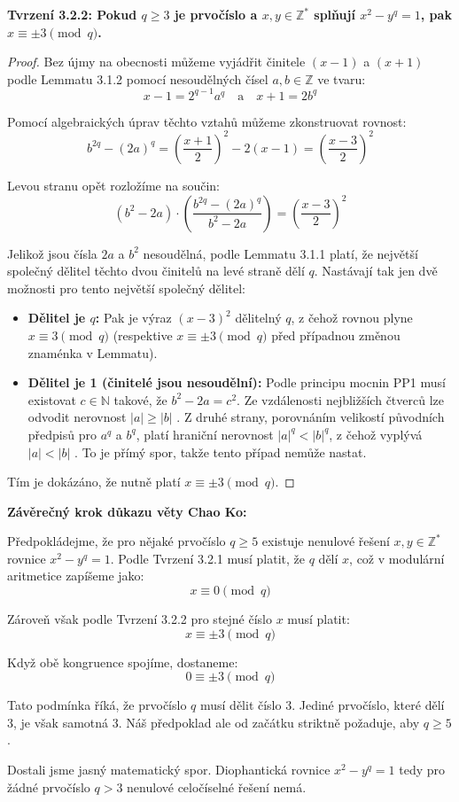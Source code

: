 \documentclass[a4paper,12pt]{article}
\begin{document}
\vspace{1em}
\textbf{Tvrzení 3.2.2: Pokud $q \ge 3$ je prvočíslo a $x, y \in \mathbb{Z}^*$ splňují $x^2 - y^q = 1$, pak $x \equiv \pm 3 \pmod q$.}
\vspace{0.5em}
\begin{proof}
Bez újmy na obecnosti můžeme vyjádřit činitele $(x-1)$ a $(x+1)$ podle Lemmatu 3.1.2 pomocí nesoudělných čísel $a, b \in \mathbb{Z}$ ve tvaru:
$$x - 1 = 2^{q-1}a^q \quad \text{a} \quad x + 1 = 2b^q $$

Pomocí algebraických úprav těchto vztahů můžeme zkonstruovat rovnost:
$$b^{2q} - (2a)^q = \left(\frac{x+1}{2}\right)^2 - 2(x-1) = \left(\frac{x-3}{2}\right)^2 $$

Levou stranu opět rozložíme na součin:
$$(b^2 - 2a) \cdot \left(\frac{b^{2q} - (2a)^q}{b^2 - 2a}\right) = \left(\frac{x-3}{2}\right)^2 $$

Jelikož jsou čísla $2a$ a $b^2$ nesoudělná, podle Lemmatu 3.1.1 platí, že největší společný dělitel těchto dvou činitelů na levé straně dělí $q$. Nastávají tak jen dvě možnosti pro tento největší společný dělitel:
\begin{itemize}
    \item \textbf{Dělitel je $q$:} Pak je výraz $(x-3)^2$ dělitelný $q$, z čehož rovnou plyne $x \equiv 3 \pmod q$ (respektive $x \equiv \pm 3 \pmod q$ před případnou změnou znaménka v Lemmatu).
    \item \textbf{Dělitel je 1 (činitelé jsou nesoudělní):} Podle principu mocnin PP1 musí existovat $c \in \mathbb{N}$ takové, že $b^2 - 2a = c^2$. Ze vzdálenosti nejbližších čtverců lze odvodit nerovnost $|a| \ge |b|$ . Z druhé strany, porovnáním velikostí původních předpisů pro $a^q$ a $b^q$, platí hraniční nerovnost $|a|^q < |b|^q$, z čehož vyplývá $|a| < |b|$ . To je přímý spor, takže tento případ nemůže nastat.
\end{itemize}
Tím je dokázáno, že nutně platí $x \equiv \pm 3 \pmod q$.
\end{proof}

\vspace{1em}
\textbf{Závěrečný krok důkazu věty Chao Ko:}
\vspace{0.5em}

Předpokládejme, že pro nějaké prvočíslo $q \ge 5$ existuje nenulové řešení $x, y \in \mathbb{Z}^*$ rovnice $x^2 - y^q = 1$. 
Podle Tvrzení 3.2.1 musí platit, že $q$ dělí $x$, což v modulární aritmetice zapíšeme jako:
$$x \equiv 0 \pmod q $$

Zároveň však podle Tvrzení 3.2.2 pro stejné číslo $x$ musí platit:
$$x \equiv \pm 3 \pmod q $$

Když obě kongruence spojíme, dostaneme:
$$0 \equiv \pm 3 \pmod q $$

Tato podmínka říká, že prvočíslo $q$ musí dělit číslo 3. Jediné prvočíslo, které dělí 3, je však samotná 3. Náš předpoklad ale od začátku striktně požaduje, aby $q \ge 5$. 

Dostali jsme jasný matematický spor. Diophantická rovnice $x^2 - y^q = 1$ tedy pro žádné prvočíslo $q > 3$ nenulové celočíselné řešení nemá.
\end{document}
